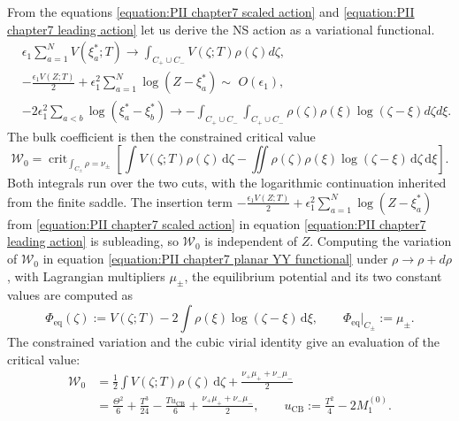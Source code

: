 \documentclass[a4paper,11pt]{article}
\newcommand{\dd}{\mathrm{d}}
\numberwithin{equation}{section}
\begin{document}
From the equations \eqref{equation:PII chapter7 scaled action} and \eqref{equation:PII chapter7 leading action} let us derive the NS action as a variational functional. 
\begin{equation}
\begin{split}
& \epsilon_1 \sum_{a=1}^N V(\xi_a^*;T) \rightarrow \int_{C_{+}\cup C_{-}} V(\zeta;T) \rho(\zeta) d\zeta ,
\\ & 
-\frac{\epsilon_1 V(Z;T)}{2} + \epsilon_1^2 \sum_{a=1}^N \log(Z-\xi^*_a) 
\sim \,\, O(\epsilon_1) ,
\\ & 
-2\epsilon_1^2 \sum_{a<b} \log(\xi_a^*-\xi_b^*) \rightarrow - \int_{C_{+}\cup C_{-}}\int_{C_{+}\cup C_{-}} \rho(\zeta)\rho(\xi) \log(\zeta-\xi) d\zeta d\xi.
\end{split}
\end{equation}
The bulk coefficient is then the constrained critical value
\begin{equation}
	\label{equation:PII chapter7 planar YY functional}
	\mathcal{W}_{0}
	=\operatorname{crit}_{\int_{C_{\pm}}\rho=\nu_{\pm}}
	\left[
	\int V(\zeta;T)\rho(\zeta)\,\dd\zeta
	-\iint\rho(\zeta)\rho(\xi)\log{(\zeta-\xi)}\,\dd\zeta\,\dd\xi
	\right].
\end{equation}
Both integrals run over the two cuts, with the logarithmic
continuation inherited from the finite saddle.  The insertion term $-\frac{\epsilon_1 V(Z;T)}{2} + \epsilon_1^2 \sum_{a=1}^N \log(Z-\xi^*_a)$
from \eqref{equation:PII chapter7 scaled action} in equation \eqref{equation:PII chapter7 leading action} is subleading,
so $\mathcal{W}_{0}$ is independent of $Z$.
Computing the variation of $\mathcal{W}_0$ in equation \eqref{equation:PII chapter7 planar YY functional} under $\rho \rightarrow \rho + d\rho$, with Lagrangian multipliers $\mu_\pm$, the equilibrium potential and its two constant values are computed as 
\begin{equation}
	\label{equation:PII chapter7 chemical potential}
	\Phi_{\mathrm{eq}}(\zeta):=V(\zeta;T)-2\int\rho(\xi)\log{(\zeta-\xi)}\,\dd\xi,
	\qquad \Phi_{\mathrm{eq}}\big|_{C_{\pm}} :=\mu_{\pm}.
\end{equation}
The constrained variation and the cubic virial identity give
an evaluation of the critical value:
\begin{equation}
	\label{equation:PII chapter7 absolute W0}
	\begin{aligned}
		\mathcal{W}_{0}
		&=\frac{1}{2}\int V(\zeta;T)\rho(\zeta)\,\dd\zeta
		+\frac{\nu_{+}\mu_{+}+\nu_{-}\mu_{-}}{2}\\
		&=\frac{\Theta^{2}}{6}+\frac{T^{3}}{24}
		-\frac{T u_{\mathrm{CB}}}{6}
		+\frac{\nu_{+}\mu_{+}+\nu_{-}\mu_{-}}{2},\qquad
		u_{\mathrm{CB}}:=\frac{T^{2}}{4}-2M_{1}^{(0)}.
	\end{aligned}
\end{equation}
\end{document}
